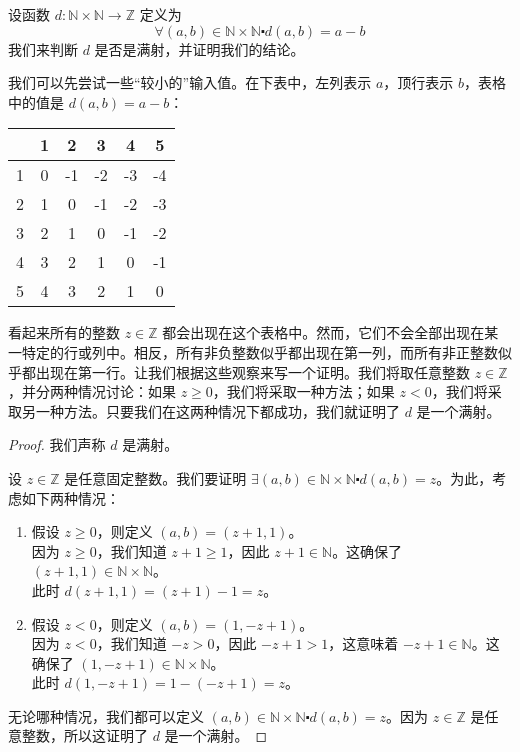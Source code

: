 \begin{example}
    设函数 $d : \mathbb{N} \times \mathbb{N} \to \mathbb{Z}$ 定义为
    \[\forall (a, b) \in \mathbb{N} \times \mathbb{N} \centerdot d(a, b) = a - b\]
    我们来判断 $d$ 是否是满射，并证明我们的结论。
    
    我们可以先尝试一些``较小的''输入值。在下表中，左列表示 $a$，顶行表示 $b$，表格中的值是 $d(a, b) = a - b$：
    \begin{center}
        \begin{tabular}{c|ccccc}
              &  1 &  2 &  3 &  4 &  5 \\
            \hline
            1 &  0 & -1 & -2 & -3 & -4 \\
            2 &  1 &  0 & -1 & -2 & -3 \\
            3 &  2 &  1 &  0 & -1 & -2 \\
            4 &  3 &  2 &  1 &  0 & -1 \\
            5 &  4 &  3 &  2 &  1 &  0 \\
        \end{tabular}
    \end{center}
    看起来所有的整数 $z \in \mathbb{Z}$ 都会出现在这个表格中。然而，它们不会全部出现在某一特定的行或列中。相反，所有非负整数似乎都出现在第一列，而所有非正整数似乎都出现在第一行。让我们根据这些观察来写一个证明。我们将取任意整数 $z \in \mathbb{Z}$，并分两种情况讨论：如果 $z \ge 0$，我们将采取一种方法；如果 $z < 0$，我们将采取另一种方法。只要我们在这两种情况下都成功，我们就证明了 $d$ 是一个满射。

    \begin{proof}
        我们声称 $d$ 是满射。

        设 $z \in \mathbb{Z}$ 是任意固定整数。我们要证明 $\exists (a, b) \in \mathbb{N} \times \mathbb{N} \centerdot d(a, b) = z$。为此，考虑如下两种情况：
        \begin{enumerate}[label=(\arabic*)]
            \item 假设 $z \ge 0$，则定义 $(a, b) = (z + 1, 1)$。\\
                因为 $z \ge 0$，我们知道 $z+1 \ge 1$，因此 $z+1 \in \mathbb{N}$。这确保了 $(z + 1, 1) \in \mathbb{N} \times \mathbb{N}$。\\
                此时 $d(z + 1, 1) = (z + 1) - 1 = z$。
            \item 假设 $z < 0$，则定义 $ (a, b) = (1, -z + 1)$。\\
                因为 $z < 0$，我们知道 $-z > 0$，因此 $-z+1 > 1$，这意味着 $-z+1 \in \mathbb{N}$。这确保了 $(1, -z+1) \in \mathbb{N} \times \mathbb{N}$。\\
                此时 $d(1, -z + 1) = 1 - (-z + 1) = z$。
        \end{enumerate}
        无论哪种情况，我们都可以定义 $(a, b) \in \mathbb{N} \times \mathbb{N} \centerdot d(a, b) = z$。因为 $z \in \mathbb{Z}$ 是任意整数，所以这证明了 $d$ 是一个满射。
    \end{proof}
\end{example}

